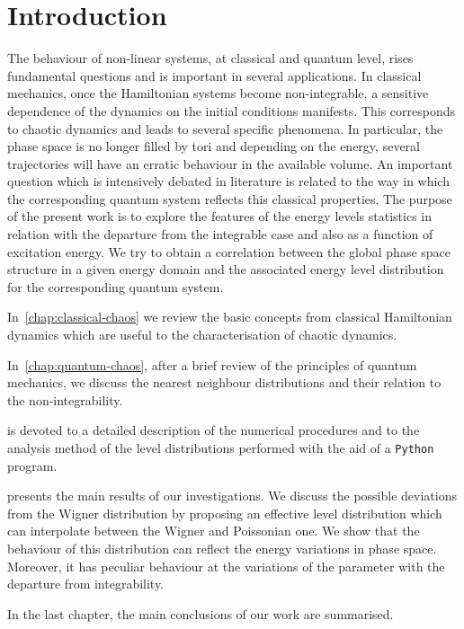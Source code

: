 \documentclass[../thesis.tex]{subfiles}
\begin{document}
\chapter{Introduction}

The behaviour of non-linear systems, at classical and quantum level, rises
fundamental questions and is important in several applications.
In classical mechanics, once the Hamiltonian systems become non-integrable,
a sensitive dependence of the dynamics on the initial conditions manifests.
This corresponds to chaotic dynamics and leads to several specific phenomena.
In particular, the phase space is no longer filled by tori and depending on the
energy, several trajectories will have an erratic behaviour in the available volume.
An important question which is intensively debated in literature is related to
the way in which the corresponding quantum system reflects this classical properties.
The purpose of the present work is to explore the features of the energy levels
statistics in relation with the departure from the integrable case and also as
a function of excitation energy. We try to obtain a correlation between the
global phase space structure in a given energy domain and the associated
energy level distribution for the corresponding quantum system.

In~\cref{chap:classical-chaos} we review the basic concepts from classical
Hamiltonian dynamics which are useful to the characterisation of chaotic dynamics.

In~\cref{chap:quantum-chaos}, after a brief review of the principles of quantum mechanics,
we discuss the nearest neighbour distributions and their relation to the
non-integrability.

 is devoted to a detailed description of the numerical procedures
and to the analysis method of the level distributions performed with the aid of a
\texttt{Python} program.

 presents the main results of our investigations.
We discuss the possible deviations from the Wigner distribution by proposing an
effective level distribution which can interpolate between the Wigner and Poissonian one.
We show that the behaviour of this distribution can reflect the energy variations
in phase space. Moreover, it has peculiar behaviour at the variations of the parameter
with the departure from integrability.

In the last chapter, the main conclusions of our work are summarised.
\end{document}
